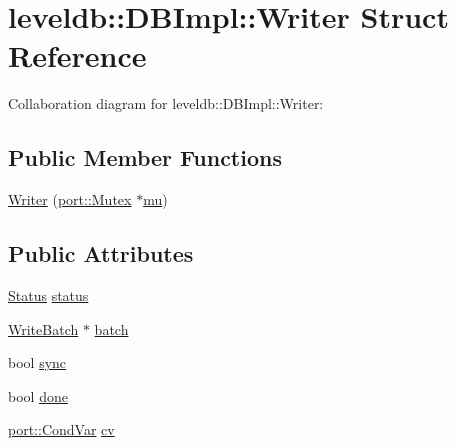 \hypertarget{structleveldb_1_1_d_b_impl_1_1_writer}{\section{leveldb\-:\-:D\-B\-Impl\-:\-:Writer Struct Reference}
\label{structleveldb_1_1_d_b_impl_1_1_writer}
}


Collaboration diagram for leveldb\-:\-:D\-B\-Impl\-:\-:Writer\-:
\subsection*{Public Member Functions}
\begin{DoxyCompactItemize}
\item 
\hyperlink{structleveldb_1_1_d_b_impl_1_1_writer_a7dfb43a804e1ded7a2a85b3bc756ea93}{Writer} (\hyperlink{classleveldb_1_1port_1_1_mutex}{port\-::\-Mutex} $\ast$\hyperlink{db__impl_8cc_a900dad9ea326bf70a183d88a8ab50a13}{mu})
\end{DoxyCompactItemize}
\subsection*{Public Attributes}
\begin{DoxyCompactItemize}
\item 
\hyperlink{classleveldb_1_1_status}{Status} \hyperlink{structleveldb_1_1_d_b_impl_1_1_writer_af3b0436a99d2679c0e0ac9f6e1fefa37}{status}
\item 
\hyperlink{classleveldb_1_1_write_batch}{Write\-Batch} $\ast$ \hyperlink{structleveldb_1_1_d_b_impl_1_1_writer_ada051134318411635892f0a7d17cb7c0}{batch}
\item 
bool \hyperlink{structleveldb_1_1_d_b_impl_1_1_writer_acb39717e1fa61127f262b474e18ec9f6}{sync}
\item 
bool \hyperlink{structleveldb_1_1_d_b_impl_1_1_writer_afc6025afd873f82252cb563687bd3106}{done}
\item 
\hyperlink{classleveldb_1_1port_1_1_cond_var}{port\-::\-Cond\-Var} \hyperlink{structleveldb_1_1_d_b_impl_1_1_writer_aacb835eedc44855a7c223fca024c5ac4}{cv}
\end{DoxyCompactItemize}


